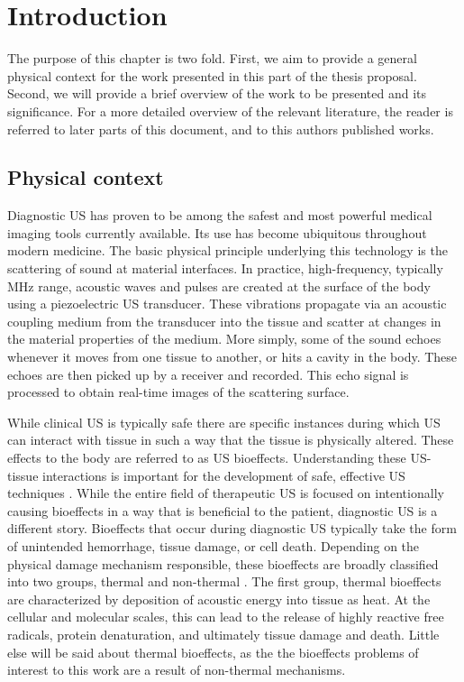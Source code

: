 \chapter{Introduction} \label{ch:usbe_intro}%
The purpose of this chapter is two fold. First, we aim to provide a
general physical context for the work presented in this part of the
thesis proposal. Second, we will provide a brief overview of the work
to be presented and its significance. For a more detailed overview of
the relevant literature, the reader is referred to later parts of this
document, and to this authors published works.

\section{Physical context} \label{sec:usbe_intro_physical_context}%
Diagnostic \ac{US} has proven to be among the safest and most powerful
medical imaging tools currently available. Its use has become
ubiquitous throughout modern medicine. The basic physical principle
underlying this technology is the scattering of sound at material
interfaces. In practice, high-frequency, typically MHz range, acoustic
waves and pulses are created at the surface of the body using a
piezoelectric \ac{US} transducer. These vibrations propagate via an
acoustic coupling medium from the transducer into the tissue and
scatter at changes in the material properties of the medium. More
simply, some of the sound echoes whenever it moves from one tissue to
another, or hits a cavity in the body. These echoes are then picked up
by a receiver and recorded. This echo signal is processed to obtain
real-time images of the scattering surface.

While clinical \ac{US} is typically safe there are specific instances
during which \ac{US} can interact with tissue in such a way that the
tissue is physically altered. These effects to the body are referred
to as \ac{US} bioeffects. Understanding these \ac{US}-tissue
interactions is important for the development of safe, effective
\ac{US} techniques \citep{Dalecki2004}. While the entire field of
therapeutic \ac{US} is focused on intentionally causing bioeffects in
a way that is beneficial to the patient, diagnostic \ac{US} is a
different story. Bioeffects that occur during diagnostic \ac{US}
typically take the form of unintended hemorrhage, tissue damage, or
cell death. Depending on the physical damage mechanism responsible,
these bioeffects are broadly classified into two groups, thermal and
non-thermal \citep{OBrien2007}. The first group, thermal bioeffects
are characterized by deposition of acoustic energy into tissue as
heat. At the cellular and molecular scales, this can lead to the
release of highly reactive free radicals, protein denaturation, and
ultimately tissue damage and death. Little else will be said about
thermal bioeffects, as the the bioeffects problems of interest to this
work are a result of non-thermal mechanisms. 

